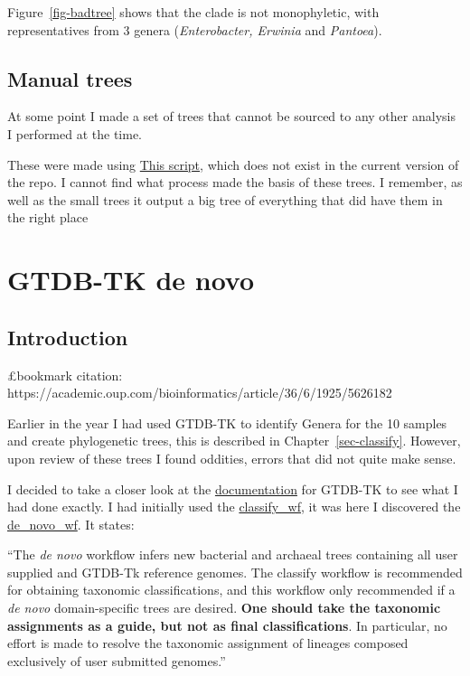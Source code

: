 \documentclass[
  letterpaper,
  DIV=11,
  numbers=noendperiod]{scrreprt}
\begin{document}
Figure~\ref{fig-badtree} shows that the clade is not monophyletic, with
representatives from 3 genera (\emph{Enterobacter, Erwinia} and
\emph{Pantoea}).

\section{Manual trees}\label{manual-trees}

At some point I made a set of trees that cannot be sourced to any other
analysis I performed at the time.

These were made using
\href{https://github.com/aptemus/tnunn_research/blob/0c487ca21d0c783b7075446d688f88ed1d7ce77a/2024-25\%20Research/frog\%20bacteria/03\%20data_analysis/call\%20API\%20and\%20process\%20json\%20-\%20with\%20legend.R}{This
script}, which does not exist in the current version of the repo. I
cannot find what process made the basis of these trees. I remember, as
well as the small trees it output a big tree of everything that did have
them in the right place


\chapter{GTDB-TK de novo}\label{gtdb-tk-de-novo}

\section{Introduction}\label{introduction-8}

£bookmark citation:
https://academic.oup.com/bioinformatics/article/36/6/1925/5626182

Earlier in the year I had used GTDB-TK to identify Genera for the 10
samples and create phylogenetic trees, this is described in
Chapter~\ref{sec-classify}. However, upon review of these trees I found
oddities, errors that did not quite make sense.

I decided to take a closer look at the
\href{https://ecogenomics.github.io/GTDBTk/index.html}{documentation}
for GTDB-TK to see what I had done exactly. I had initially used the
\href{https://ecogenomics.github.io/GTDBTk/commands/classify_wf.html?highlight=classify_wf}{classify\_wf},
it was here I discovered the
\href{https://ecogenomics.github.io/GTDBTk/commands/de_novo_wf.html}{de\_novo\_wf}.
It states:

``The \emph{de novo} workflow infers new bacterial and archaeal trees
containing all user supplied and GTDB-Tk reference genomes. The classify
workflow is recommended for obtaining taxonomic classifications, and
this workflow only recommended if a \emph{de novo} domain-specific trees
are desired. \textbf{One should take the taxonomic assignments as a
guide, but not as final classifications}. In particular, no effort is
made to resolve the taxonomic assignment of lineages composed
exclusively of user submitted genomes.''
\end{document}
